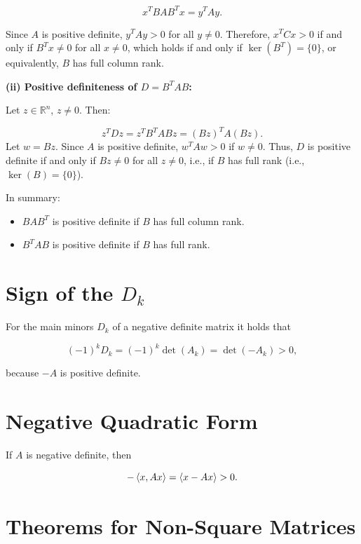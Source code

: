 \[
    x^T BAB^T x = y^T A y.
\]

Since \( A \) is positive definite, \( y^T A y > 0 \) for all \( y \ne 0 \). Therefore, 
\( x^T C x > 0 \) if and only if \( B^T x \ne 0 \) for all \( x \ne 0 \), which holds if and only if 
\( \ker(B^T) = \{0\} \), or equivalently, \( B \) has full column rank.

\textbf{(ii) Positive definiteness of \( D = B^T A B \):}  

Let \( z \in \mathbb{R}^n \), \( z \ne 0 \). Then:

\[
    z^T D z = z^T B^T A B z = (B z)^T A (B z).
\]
Let \( w = B z \). Since \( A \) is positive definite, \( w^T A w > 0 \) if \( w \ne 0 \). Thus, \( D \) is positive definite if 
and only if \( B z \ne 0 \) for all \( z \ne 0 \), i.e., if \( B \) has full rank (i.e., \( \ker(B) = \{0\} \)).

In summary:

\begin{itemize}

    \item \( BAB^T \) is positive definite if \( B \) has full column rank.

    \item \( B^T A B \) is positive definite if \( B \) has full rank.

\end{itemize}

\QED

\section{Sign of the \texorpdfstring{\(D_k\)}{}}

For the main minors \(D_k\) of a negative definite matrix it holds that 

\[
    (-1)^k D_k = (-1)^k \det(A_k) = \det(-A_k) > 0,
\]

because \(-A\) is positive definite.

\section{Negative Quadratic Form}

If \(A\) is negative definite, then 

\[
    -\left\langle x, Ax\right\rangle = \langle x -Ax \rangle > 0.
\]

\section{Theorems for Non-Square Matrices}

